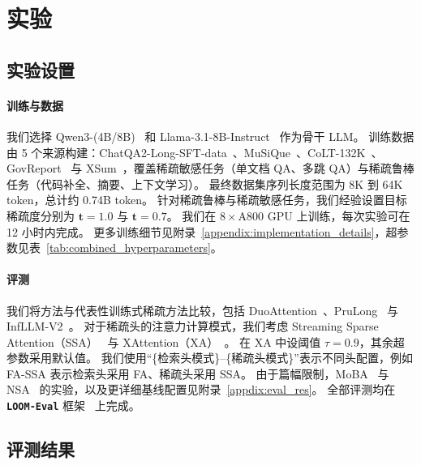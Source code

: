 

\section{实验}
\label{sec:experiment}

\subsection{实验设置}
\label{subsec:exp_settings}

\paragraph{训练与数据}
\label{subsec:train_settings}
我们选择 Qwen3-(4B/8B)~\citep{yang2025qwen3technicalreport} 和 Llama-3.1-8B-Instruct~\citep{grattafiori2024llama} 作为骨干 LLM。
训练数据由 5 个来源构建：ChatQA2-Long-SFT-data~\citep{xu2024chatqa}、MuSiQue~\citep{trivedi2022musique}、CoLT-132K~\citep{li2025aixcoder}、GovReport~\citep{huang-etal-2021-efficient} 与 XSum~\citep{xsum-emnlp}，覆盖稀疏敏感任务（单文档 QA、多跳 QA）与稀疏鲁棒任务（代码补全、摘要、上下文学习）。
最终数据集序列长度范围为 8K 到 64K token，总计约 0.74B token。
针对稀疏鲁棒与稀疏敏感任务，我们经验设置目标稀疏度分别为 $\boldsymbol{t}=1.0$ 与 $\boldsymbol{t}=0.7$。
我们在 $8\times$A800 GPU 上训练，每次实验可在 12 小时内完成。
更多训练细节见附录~\ref{appendix:implementation_details}，超参数见表~\ref{tab:combined_hyperparameters}。

\vspace{-0.5em}
\paragraph{评测}
\label{subsec:baseline}
我们将方法与代表性训练式稀疏方法比较，包括 DuoAttention~\citep{xiaoduoattention2025}、PruLong~\citep{bhaskar2025cache} 与 InfLLM-V2~\citep{infllmv2}。
对于稀疏头的注意力计算模式，我们考虑 Streaming Sparse Attention（SSA）~\citep{streamingllm} 与 XAttention（XA）~\citep{xattention}。
在 XA 中设阈值 $\tau=0.9$，其余超参数采用默认值。
我们使用“\{检索头模式\}–\{稀疏头模式\}”表示不同头配置，例如 FA-SSA 表示检索头采用 FA、稀疏头采用 SSA。
由于篇幅限制，MoBA~\citep{moba} 与 NSA~\citep{NSA} 的实验，以及更详细基线配置见附录~\ref{appdix:eval_res}。
全部评测均在 \textbf{\texttt{LOOM-Eval}} 框架~\citep{tang2025loom} 上完成。

\subsection{评测结果}
\label{subsec:eval_res_main}

